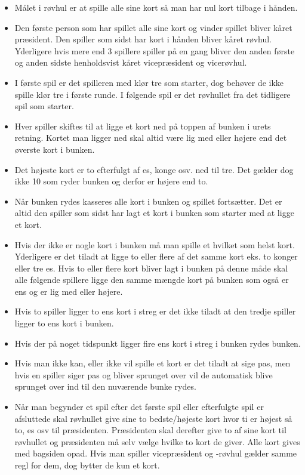 \documentclass[a4paper, 12pt]{article}
\begin{document}
\begin{itemize}
	\item Målet i røvhul er at spille alle sine kort så man har nul kort tilbage i hånden.
	\item Den første person som har spillet alle sine kort og vinder spillet bliver kåret præsident. Den spiller som sidst har kort i hånden bliver kåret røvhul. Yderligere hvis mere end 3 spillere spiller på en gang bliver den anden første og anden sidste henholdsvist kåret vicepræsident og vicerøvhul.
	\item I første spil er det spilleren med klør tre som starter, dog behøver de ikke spille klør tre i første runde. I følgende spil er det røvhullet fra det tidligere spil som starter.
	\item Hver spiller skiftes til at ligge et kort ned på toppen af bunken i urets retning. Kortet man ligger ned skal altid være lig med eller højere end det øverste kort i bunken. 
	\item Det højeste kort er to efterfulgt af es, konge osv. ned til tre. Det gælder dog ikke 10 som ryder bunken og derfor er højere end to.
	\item Når bunken rydes kasseres alle kort i bunken og spillet fortsætter. Det er altid den spiller som sidst har lagt et kort i bunken som starter med at ligge et kort.
	\item Hvis der ikke er nogle kort i bunken må man spille et hvilket som helst kort. Yderligere er det tiladt at ligge to eller flere af det samme kort eks. to konger eller tre es. Hvis to eller flere kort bliver lagt i bunken på denne måde skal alle følgende spillere ligge den samme mængde kort på bunken som også er ens og er lig med eller højere.
	\item Hvis to spiller ligger to ens kort i streg er det ikke tiladt at den tredje spiller ligger to ens kort i bunken.
	\item Hvis der på noget tidspunkt ligger fire ens kort i streg i bunken rydes bunken.
	\item Hvis man ikke kan, eller ikke vil spille et kort er det tiladt at sige pas, men hvis en spiller siger pas og bliver sprunget over vil de automatisk blive sprunget over ind til den nuværende bunke rydes.
	\item Når man begynder et spil efter det første spil eller efterfulgte spil er afsluttede skal røvhullet give sine to bedste/højeste kort hvor ti er højest så to, es osv til præsidenten. Præsidenten skal derefter give to af sine kort til røvhullet og præsidenten må selv vælge hvilke to kort de giver. Alle kort gives med bagsiden opad. Hvis man spiller vicepræsident og -røvhul gælder samme regl for dem, dog bytter de kun et kort. 
\end{itemize}
\bigbreak
\end{document}
